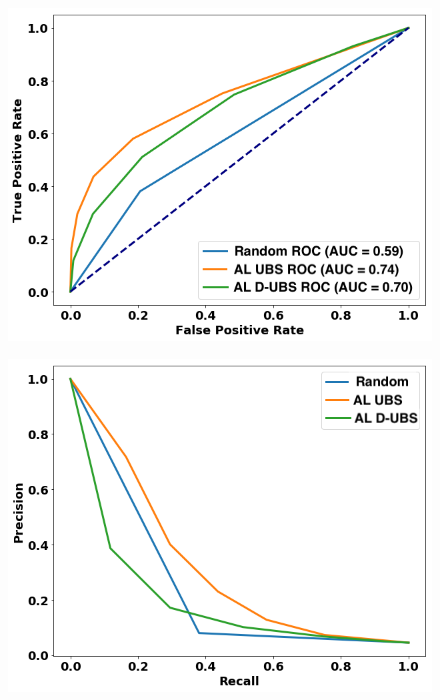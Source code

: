 \begin{figure}
\centering
\begin{minipage}[b]{.4\textwidth}
\includegraphics[trim=0in 0.1in 0.1in 0.in,clip,width=1.0\textwidth]{figures/rocs_round5_new.png}
\captionsetup{labelformat=empty}
\label{fig:rocs_round5}
\end{minipage}\qquad
\hspace{2ex}
\begin{minipage}[b]{.4\textwidth}
\includegraphics[trim=0in 0.1in 0.1in 0.in,clip,width=1.0\textwidth]{figures/prcs_round5_rule.png}
\captionsetup{labelformat=empty}
\end{minipage}

\end{figure}

